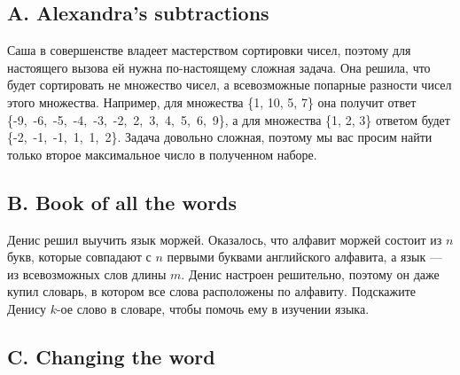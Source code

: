 \subsection*{A. Alexandra’s subtractions}

Саша в совершенстве владеет мастерством сортировки чисел, поэтому для настоящего вызова ей нужна по-настоящему сложная задача. Она решила, что будет сортировать не множество чисел, а всевозможные попарные разности чисел этого множества. Например, для множества \{1, 10, 5, 7\} она получит ответ \mbox{\{-9, -6, -5, -4, -3, -2, 2, 3, 4, 5, 6, 9\}}, а для множества \{1, 2, 3\} ответом будет \mbox{\{-2, -1, -1, 1, 1, 2\}}. Задача довольно сложная, поэтому мы вас просим найти только второе максимальное число в полученном наборе.






\subsection*{B. Book of all the words}

Денис решил выучить язык моржей. Оказалось, что алфавит моржей состоит из $n$ букв, которые совпадают с $n$ первыми буквами английского алфавита, а язык --- из всевозможных слов длины $m$. Денис настроен решительно, поэтому он даже купил словарь, в котором все слова расположены по алфавиту. Подскажите Денису $k$-ое слово в словаре, чтобы помочь ему в изучении языка.







\subsection*{C. Changing the word}

